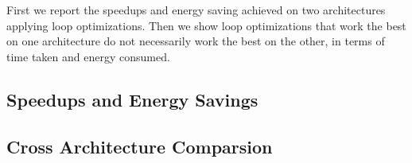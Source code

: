 First we report the speedups and energy saving achieved on two architectures applying
loop optimizations. Then we show loop optimizations that work the best on
one architecture do not necessarily work the best on the other, in terms of
time taken and energy consumed.
\subsection{Speedups and Energy Savings}

\subsection{Cross Architecture Comparsion}

\begin{figure}
\centering
{} 
\caption{
}                   
\label{fig:Brdr2d-TE}                                                   
\end{figure} 

